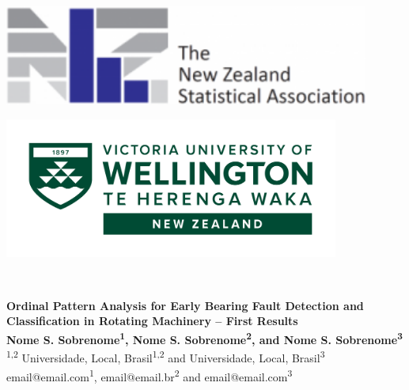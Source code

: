 \documentclass[a0,portrait]{a0poster}
\begin{document}
\begin{mdframed}[style=MyFrame]

\begin{minipage}[b]{0.33\linewidth}
\raggedright
\includegraphics[width=12cm,valign=t]{NZSA-logo-words-e1505785105112-1.png}
\end{minipage}
%
\begin{minipage}[b]{0.33\linewidth}
\centering
\hfill
\end{minipage}
% 
\begin{minipage}[b]{0.33\linewidth}
\raggedleft
\includegraphics[width=11cm,valign=t]{"Logo Offshore Standard Landscape Reversed RGB.png"}
\end{minipage}\\

\vspace{3cm}
\begin{minipage}[h]{0.98\linewidth}
\centering \huge \color{SteelBlue} \textbf{Ordinal Pattern Analysis for Early Bearing Fault Detection and Classification in Rotating Machinery -- First Results} \color{Black}\\ %
\Large \textbf{Nome S. Sobrenome\textsuperscript{1}, Nome S. Sobrenome\textsuperscript{2}, and Nome S. Sobrenome\textsuperscript{3}}\\ %
\normalsize \textsuperscript{1,2} Universidade, Local, Brasil\textsuperscript{1,2} and Universidade, Local, Brasil\textsuperscript{3}\\ %
email@email.com\textsuperscript{1}, email@email.br\textsuperscript{2} and email@email.com\textsuperscript{3}\\
\end{minipage}
\vspace{0.5cm} %


\end{mdframed}
\end{document}
